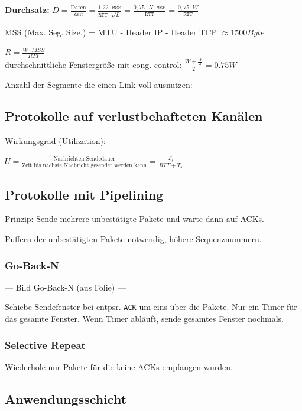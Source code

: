 \documentclass[fs, footer]{latex4ei}
\begin{document}
\begin{multicols*}{4}
{{	}
	\textbf{Durchsatz:} $D = \frac{\text{Daten}}{\text{Zeit}} = \frac{1.22 \cdot \texttt{MSS}}{\texttt{RTT} \cdot \sqrt{L}} = \frac{0,75 \cdot N \cdot \texttt{MSS}}{\texttt{RTT}} = \frac{0,75 \cdot W}{\texttt{RTT}}$


MSS (Max. Seg. Size.) = MTU - Header IP - Header TCP $\approx 1500 \si{Byte}$

$R = \frac{W \cdot  MSS}{RTT}$ \\

durchschnittliche Fenstergröße mit cong. control: $\frac{W + \frac W 2}{2} = 0.75 W$

Anzahl der Segmente die einen Link voll ausnutzen:

}

\subsection{Protokolle auf verlustbehafteten Kanälen}

Wirkungsgrad (Utilization):

$U = \frac{\text{Nachrichten Sendedauer}}{\text{Zeit bis nächste Nachricht gesendet werden kann}} = \frac{T_s}{RTT + T_s}$

\subsection{Protokolle mit Pipelining}
Prinzip: Sende mehrere unbestätigte Pakete und warte dann auf ACKs.

Puffern der unbestätigten Pakete notwendig, höhere Sequenznummern.

\subsubsection{Go-Back-N}

--- Bild Go-Back-N (aus Folie) ---



Schiebe Sendefenster bei entpsr. \texttt{ACK} um eins über die Pakete.
Nur ein Timer für das gesamte Fenster. Wenn Timer abläuft, sende gesamtes Fenster nochmals.


\subsubsection{Selective Repeat}

Wiederhole nur Pakete für die keine ACKs empfangen wurden.
\subsection{Anwendungsschicht} %
\label{sub:anwendungsschicht}


\end{multicols*}
\end{document}
